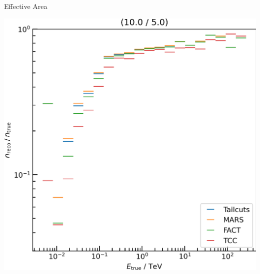 \begin{frame}{Effective Area}
\begin{minipage}{0.32\textwidth}
    \else
      \centering
      \includegraphics[width=\textwidth]{plots/effective_area/aeff_10.0_5.0_light.png}
    \fi
  \end{minipage}
\end{frame}


